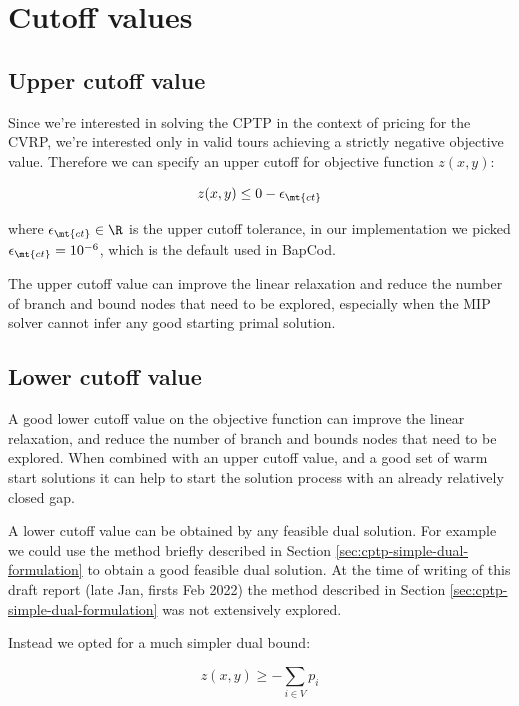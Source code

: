 \section{Cutoff values}


\subsection{Upper cutoff value}
Since we're interested in solving the CPTP in the context of pricing for the CVRP, we're interested only in valid tours achieving a strictly negative objective value.
Therefore we can specify an upper cutoff for objective function $z(x, y)$:

\begin{equation}
	z(x, y) \le 0 - \epsilon_{\mt{ct}}
\end{equation}

where $\epsilon_{\mt{ct}} \in \R$ is the upper cutoff tolerance, in our implementation we picked $\epsilon_{\mt{ct}} = 10^{-6}$, which is the default used in BapCod.

The upper cutoff value can improve the linear relaxation and reduce the number of branch and bound nodes that need to be explored, especially when the MIP solver cannot infer any good starting primal solution.

\subsection{Lower cutoff value}
A good lower cutoff value on the objective function can improve the linear relaxation, and reduce the number of branch and bounds nodes that need to be explored.
When combined with an upper cutoff value, and a good set of warm start solutions it can help to start the solution process with an already relatively closed gap.

A lower cutoff value can be obtained by any feasible dual solution.
For example we could use the method briefly described in Section \ref{sec:cptp-simple-dual-formulation} to obtain a good feasible dual solution.
At the time of writing of this draft report (late Jan, firsts Feb 2022) the method described in Section \ref{sec:cptp-simple-dual-formulation} was not extensively explored.

Instead we opted for a much simpler dual bound:

\begin{equation}
	z(x, y) \ge - \sum_{i \in V} p_i
\end{equation}

